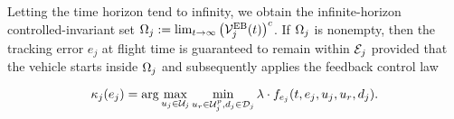 Letting the time horizon tend to infinity, we obtain the infinite-horizon controlled-invariant set $\Omega_j := \lim_{t \to \infty} \left( \mathcal{V}^{\text{EB}}_{j}(t) \right)^c$. If $\Omega_j$ is nonempty, then the tracking error $e_j$ at flight time is guaranteed to remain within $\mathcal{E}_j$ provided that the vehicle starts inside $\Omega_j$ and subsequently applies the feedback control law

\begin{equation}
\label{eq:robust_tracking_law}
\tracklaw_j(e_j) = \arg\max_{\ctrl_j \in \cset_j} \min_{\ctrl_r \in\cset^\pos_j, \dstb_j \in \dset_j} \costate \cdot \fdyn_{e_j}(t,e_j,\ctrl_j,\ctrl_r,\dstb_j).
\end{equation}

%
%
